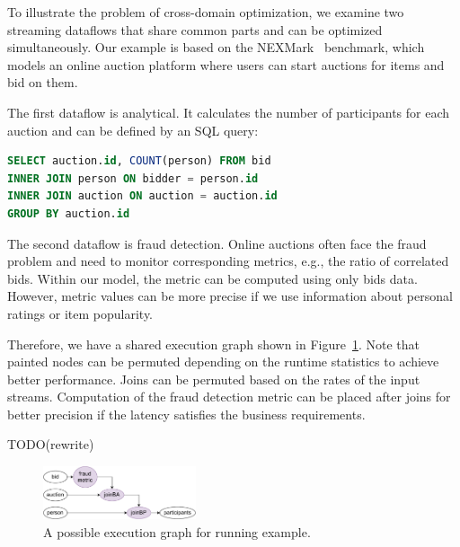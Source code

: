 To illustrate the problem of cross-domain optimization, we examine two streaming dataflows that share common parts and can be optimized simultaneously. Our example is based on the NEXMark~\cite{tucker2008nexmark} benchmark, which models an online auction platform where users can start auctions for items and bid on them.

The first dataflow is analytical. It calculates the number of participants for each auction and can be defined by an SQL query:
\begin{lstlisting}[language=SQL]
SELECT auction.id, COUNT(person) FROM bid
INNER JOIN person ON bidder = person.id
INNER JOIN auction ON auction = auction.id
GROUP BY auction.id
\end{lstlisting}

The second dataflow is fraud detection. Online auctions often face the fraud problem and need to monitor corresponding metrics, e.g., the ratio of correlated bids. Within our model, the metric can be computed using only bids data.
However, metric values can be more precise if we use information about personal ratings or item popularity.

Therefore, we have a shared execution graph shown in Figure~\ref{running_example}. Note that painted nodes can be permuted depending on the runtime statistics to achieve better performance. Joins can be permuted based on the rates of the input streams. Computation of the fraud detection metric can be placed after joins for better precision if the latency satisfies the business requirements.

TODO(rewrite)

\begin{figure}[h!]
    \includegraphics[width=0.4\textwidth]{images/poster.pdf}
    \caption{A possible execution graph for running example.}
    \label{running_example}
\end{figure}
